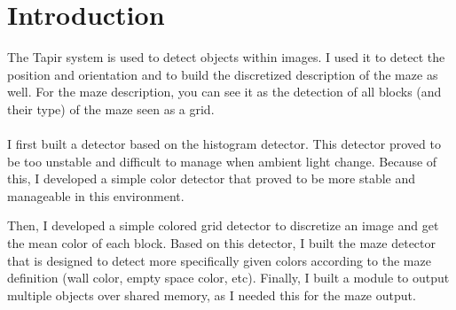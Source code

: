 \section{Introduction}

The Tapir system is used to detect objects within images. I used 
it to detect the \khepera{} position and orientation and to build the 
discretized description of the maze as well. For the maze description, 
you can see it as the detection of all blocks (and their type) of the 
maze seen as a grid.
\\
\\
I first built a detector based on the histogram detector. This detector 
proved to be too unstable and difficult to manage when ambient light 
change. Because of this, I developed a simple color detector that 
proved to be more stable and manageable in this environment. 

Then, I developed a simple colored grid detector to discretize an image 
and get the mean color of each block. Based on this detector, I built 
the maze detector that is designed to detect more specifically given 
colors according to the maze definition (wall color, empty space color, 
etc). Finally, I built a module to output multiple objects over shared 
memory, as I needed this for the maze output.
